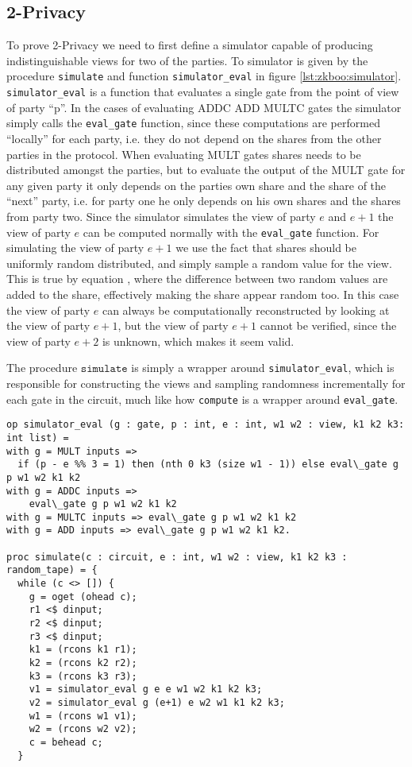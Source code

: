 \subsection{2-Privacy}
\label{sec:decomp_privacy}
To prove 2-Privacy we need to first define a simulator capable of producing
indistinguishable views for two of the parties. To simulator is given by the
procedure \texttt{simulate} and function \texttt{simulator\_eval} in figure \ref{lst:zkboo:simulator}.
\texttt{simulator\_eval} is a function that evaluates a single gate from the
point of view of party ``p''. In the cases of evaluating ADDC ADD MULTC gates
the simulator simply calls the \texttt{eval\_gate} function, since these
computations are performed ``locally'' for each party, i.e. they do not depend
on the shares from the other parties in the protocol.
When evaluating MULT gates shares needs to be distributed amongst the parties,
but to evaluate the output of the MULT gate for any given party it only depends
on the parties own share and the share of the ``next'' party, i.e. for party one
he only depends on his own shares and the shares from party two. Since
the simulator simulates the view of party $e$ and $e+1$ the view of party $e$
can be computed normally with the \texttt{eval\_gate} function. For simulating
the view of party $e+1$ we use the fact that shares should be uniformly random
distributed, and simply sample a random value for the view.
This is true by equation , where
the difference between two random values are added to the share, effectively
making the share appear random too.
In this case the view of party $e$ can always be computationally reconstructed
by looking at the view of party $e+1$, but the view of party $e+1$ cannot be
verified, since the view of party $e+2$ is unknown, which makes it seem valid.


The procedure $\texttt{simulate}$ is simply a wrapper around
\texttt{simulator\_eval}, which is responsible for constructing the views and
sampling randomness incrementally for each gate in the circuit, much like how \texttt{compute} is a wrapper around \texttt{eval\_gate}.

\begin{lstlisting}[float,label=lst:zkboo:simulator,caption= Simulator]
op simulator_eval (g : gate, p : int, e : int, w1 w2 : view, k1 k2 k3: int list) =
with g = MULT inputs =>
  if (p - e %% 3 = 1) then (nth 0 k3 (size w1 - 1)) else eval\_gate g p w1 w2 k1 k2
with g = ADDC inputs =>
    eval\_gate g p w1 w2 k1 k2
with g = MULTC inputs => eval\_gate g p w1 w2 k1 k2
with g = ADD inputs => eval\_gate g p w1 w2 k1 k2.

proc simulate(c : circuit, e : int, w1 w2 : view, k1 k2 k3 : random_tape) = {
  while (c <> []) {
    g = oget (ohead c);
    r1 <$ dinput;
    r2 <$ dinput;
    r3 <$ dinput;
    k1 = (rcons k1 r1);
    k2 = (rcons k2 r2);
    k3 = (rcons k3 r3);
    v1 = simulator_eval g e e w1 w2 k1 k2 k3;
    v2 = simulator_eval g (e+1) e w2 w1 k1 k2 k3;
    w1 = (rcons w1 v1);
    w2 = (rcons w2 v2);
    c = behead c;
  }
\end{lstlisting}

